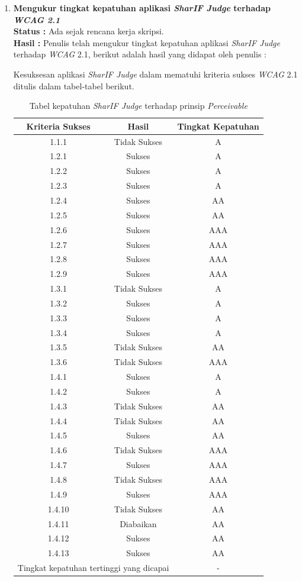 \documentclass[a4paper,twoside]{article}
\begin{document}
\begin{enumerate}
		
		\item \textbf{Mengukur tingkat kepatuhan aplikasi \textit{SharIF Judge} terhadap \textit{WCAG 2.1}}\\
		{\bf Status :} Ada sejak rencana kerja skripsi.\\
		{\bf Hasil :} Penulis telah mengukur tingkat kepatuhan aplikasi \textit{SharIF Judge} terhadap \textit{WCAG} 2.1, berikut adalah hasil yang didapat oleh penulis :
		
		Kesuksesan aplikasi \textit{SharIF Judge} dalam mematuhi kriteria sukses \textit{WCAG} 2.1 ditulis dalam tabel-tabel berikut.
		
		\begin{table}[H]
			\centering
			\caption{Tabel kepatuhan \textit{SharIF Judge} terhadap prinsip \textit{Perceivable}}
			\label{tab:kepatuhan_sharif_judge_perceivable}
			\begin{tabular}{|c|c|c|}
				\hline
				Kriteria Sukses & Hasil & Tingkat Kepatuhan \\
				\hline
				1.1.1 & Tidak Sukses & A\\
				1.2.1 & Sukses & A\\
				1.2.2 & Sukses & A\\
				1.2.3 & Sukses & A\\
				1.2.4 & Sukses & AA\\
				1.2.5 & Sukses & AA\\
				1.2.6 & Sukses & AAA\\
				1.2.7 & Sukses & AAA\\
				1.2.8 & Sukses & AAA\\
				1.2.9 & Sukses & AAA\\
				1.3.1 & Tidak Sukses & A\\
				1.3.2 & Sukses & A\\
				1.3.3 & Sukses & A\\
				1.3.4 & Sukses & A\\
				1.3.5 & Tidak Sukses & AA \\
				1.3.6 & Tidak Sukses & AAA \\
				1.4.1 & Sukses & A\\
				1.4.2 & Sukses & A\\
				1.4.3 & Tidak Sukses & AA\\
				1.4.4 & Tidak Sukses & AA\\
				1.4.5 & Sukses & AA\\
				1.4.6 & Tidak Sukses & AAA\\
				1.4.7 & Sukses & AAA\\
				1.4.8 & Tidak Sukses & AAA\\
				1.4.9 & Sukses & AAA\\
				1.4.10 & Tidak Sukses & AA \\
				1.4.11 & Diabaikan & AA \\
				1.4.12 & Sukses & AA\\
				1.4.13 & Sukses & AA\\
				\hline
				\multicolumn{2}{|c|}{Tingkat kepatuhan tertinggi yang dicapai} & - \\
				\hline
			\end{tabular}
		\end{table}
		

\end{enumerate}
\end{document}
